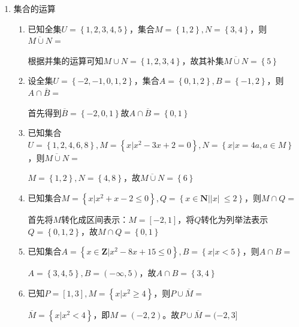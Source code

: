 \begin{enumerate}
    \item 集合的运算
    \begin{enumerate}
        \item 已知全集$U = \left\{1,2,3,4,5\right\}$，集合$M = \left\{1,2\right\}, N = \left\{3,4\right\}$，则$\overline{M \cup N} =$\blkda{$\left\{5\right\}$}
        \begin{jieda}
            根据并集的运算可知$M\cup N = \left\{1,2,3,4\right\}$，故其补集$\overline{M\cup N} = \left\{5\right\}$ 
        \end{jieda}
        \item 设全集$U = \left\{-2, -1, 0, 1, 2\right\}$，集合$A = \left\{0,1,2\right\}, B = \left\{-1, 2\right\}$，则$A \cap \overline{B} = $
        \begin{jieda}
            首先得到$\overline{B} = \left\{-2,0,1\right\}$故$A \cap \overline{B} = \left\{0,1\right\}$
        \end{jieda}
        \item 已知集合$U = \left\{1,2,4,6,8\right\}, M = \left\{x | x^2-3x+2=0\right\}, N = \left\{x | x = 4a, a \in M\right\}$，则$\overline{M \cup N} = $ \blkda{$\left\{6\right\}$}
        \begin{jieda}
            $M = \left\{1,2\right\}, N = \left\{4, 8\right\}$，故$\overline{M \cup N} = \left\{6\right\}$
        \end{jieda}
        \item 已知集合$M = \left\{x | x^2 + x -2 \leq 0\right\}, Q = \left\{x \in \mathbf{N} | |x|\ \leq 2\right\}$，则$M \cap Q = $ 
        \begin{jieda}
            首先将$M$转化成区间表示：$M = [-2, 1]$，将$Q$转化为列举法表示$Q = \left\{0,1,2\right\}$，故$M \cap Q = \left\{0, 1\right\}$
        \end{jieda}
        \item 已知集合$A = \left\{x \in \mathbf{Z} | x^2 - 8x + 15 \leq 0\right\}, B = \left\{x | x < 5\right\}$，则$A \cap B = $
        \begin{jieda}
            $A = \left\{3,4,5\right\}, B = (-\infty, 5)$，故$A \cap B = \left\{3,4\right\}$
        \end{jieda}
        \item 已知$P = [1,3], M = \left\{x | x^2 \geq 4\right\}$，则$P \cup \overline{M} = $\blkda{$(-2,3]$}
        \begin{jieda}
            $\overline{M} = \left\{x | x^2 < 4\right\}$，即$M = (-2, 2)$。故$P \cup \overline{M} = (-2,3]$ 

\end{jieda}
\end{enumerate}
\end{enumerate}
